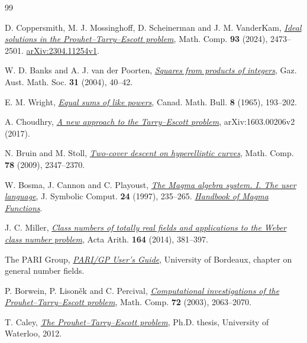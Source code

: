\begin{thebibliography}{99}

D. Coppersmith, M. J. Mossinghoff, D. Scheinerman and J. M. VanderKam,
\href{https://doi.org/10.1090/mcom/3917}{\emph{Ideal solutions in the Prouhet--Tarry--Escott problem}}, Math. Comp. \textbf{93} (2024), 2473--2501. \href{https://arxiv.org/html/2304.11254v1}{arXiv:2304.11254v1}.

W. D. Banks and A. J. van der Poorten, \href{https://austms.org.au/wp-content/uploads/Gazette/2004/Mar04/Mar2004.pdf}{\emph{Squares from products of integers}}, Gaz. Aust. Math. Soc. \textbf{31} (2004), 40--42.

E. M. Wright, \href{https://doi.org/10.4153/CMB-1965-015-7}{\emph{Equal sums of like powers}}, Canad. Math. Bull. \textbf{8} (1965), 193--202.

A. Choudhry, \href{https://arxiv.org/abs/1603.00206v2}{\emph{A new approach to the Tarry--Escott problem}}, arXiv:1603.00206v2 (2017).

N. Bruin and M. Stoll, \href{https://arxiv.org/abs/0803.2052}{\emph{Two-cover descent on hyperelliptic curves}}, Math. Comp. \textbf{78} (2009), 2347--2370.

W. Bosma, J. Cannon and C. Playoust, \href{https://doi.org/10.1006/jsco.1996.0125}{\emph{The Magma algebra system. I. The user language}}, J. Symbolic Comput. \textbf{24} (1997), 235--265. \href{https://magma.maths.usyd.edu.au/magma/handbook/}{\emph{Handbook of Magma Functions}}.

J. C. Miller, \href{https://doi.org/10.4064/aa164-4-4}{\emph{Class numbers of totally real fields and applications to the Weber class number problem}}, Acta Arith. \textbf{164} (2014), 381--397.

 The PARI Group, \href{https://pari.math.u-bordeaux.fr/dochtml/html-stable/General_number_fields.html}{\emph{PARI/GP User’s Guide}}, University of Bordeaux, chapter on general number fields.

P. Borwein, P. Lisoněk and C. Percival, \href{https://www.daemonology.net/papers/pte.pdf}{\emph{Computational investigations of the Prouhet--Tarry--Escott problem}}, Math. Comp. \textbf{72} (2003), 2063--2070.

T. Caley, \href{https://uwspace.uwaterloo.ca/items/b24da5f2-8532-426b-ad80-3009df50bdba}{\emph{The Prouhet--Tarry--Escott problem}}, Ph.D. thesis, University of Waterloo, 2012.


\end{thebibliography}
